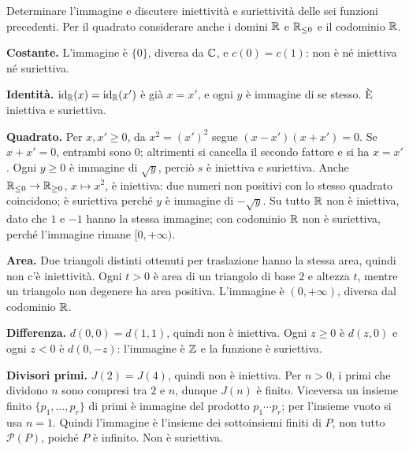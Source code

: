\begin{esercizio}
Determinare l'immagine e discutere iniettività e suriettività delle sei funzioni precedenti. Per il quadrato considerare anche i domini $\mathbb{R}$ e $\mathbb{R}_{\le0}$ e il codominio $\mathbb{R}$.
\end{esercizio}
\begin{svolgimento}
\textbf{Costante.} L'immagine è $\{0\}$, diversa da $\mathbb{C}$, e $c(0)=c(1)$: non è né iniettiva né suriettiva.

\textbf{Identità.} $\operatorname{id}_{\mathbb{R}}(x)=\operatorname{id}_{\mathbb{R}}(x')$ è già $x=x'$, e ogni $y$ è immagine di se stesso. È iniettiva e suriettiva.

\textbf{Quadrato.} Per $x,x'\ge0$, da $x^2=(x')^2$ segue $(x-x')(x+x')=0$. Se $x+x'=0$, entrambi sono $0$; altrimenti si cancella il secondo fattore e si ha $x=x'$. Ogni $y\ge0$ è immagine di $\sqrt y$, perciò $s$ è iniettiva e suriettiva. Anche $\mathbb{R}_{\le0}\to\mathbb{R}_{\ge0}$, $x\mapsto x^2$, è iniettiva: due numeri non positivi con lo stesso quadrato coincidono; è suriettiva perché $y$ è immagine di $-\sqrt y$. Su tutto $\mathbb{R}$ non è iniettiva, dato che $1$ e $-1$ hanno la stessa immagine; con codominio $\mathbb{R}$ non è suriettiva, perché l'immagine rimane $[0,+\infty)$.

\textbf{Area.} Due triangoli distinti ottenuti per traslazione hanno la stessa area, quindi non c'è iniettività. Ogni $t>0$ è area di un triangolo di base $2$ e altezza $t$, mentre un triangolo non degenere ha area positiva. L'immagine è $(0,+\infty)$, diversa dal codominio $\mathbb{R}$.

\textbf{Differenza.} $d(0,0)=d(1,1)$, quindi non è iniettiva. Ogni $z\ge0$ è $d(z,0)$ e ogni $z<0$ è $d(0,-z)$: l'immagine è $\mathbb{Z}$ e la funzione è suriettiva.

\textbf{Divisori primi.} $J(2)=J(4)$, quindi non è iniettiva. Per $n>0$, i primi che dividono $n$ sono compresi tra $2$ e $n$, dunque $J(n)$ è finito. Viceversa un insieme finito $\{p_1,\ldots,p_r\}$ di primi è immagine del prodotto $p_1\cdots p_r$; per l'insieme vuoto si usa $n=1$. Quindi l'immagine è l'insieme dei sottoinsiemi finiti di $P$, non tutto $\mathcal P(P)$, poiché $P$ è infinito. Non è suriettiva.
\end{svolgimento}


